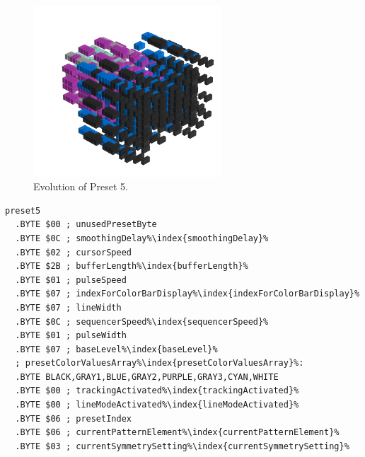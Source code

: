 \clearpage
\rhead[]{\leftmark}
\begin{minipage}[b]{0.48\linewidth}

\begin{figure}[H]                                                          
  \centering                                                             
  \begin{adjustbox}{width=7cm,center}                                   
  \includegraphics[width=7cm]{src/presets/pattern5-45.png}%
  \end{adjustbox}                                                        
\caption{Evolution of Preset 5.}                                           
\end{figure}                                                               
\end{minipage}
\hspace{0.1cm}
\begin{minipage}[b]{0.48\linewidth}                                       
                                                                           
\begin{lstlisting}[basicstyle=\ttfamily\scriptsize,caption=Data structure for Preset 5.,escapechar=\%]
preset5
  .BYTE $00 ; unusedPresetByte
  .BYTE $0C ; smoothingDelay%\index{smoothingDelay}%
  .BYTE $02 ; cursorSpeed
  .BYTE $2B ; bufferLength%\index{bufferLength}%
  .BYTE $01 ; pulseSpeed
  .BYTE $07 ; indexForColorBarDisplay%\index{indexForColorBarDisplay}%
  .BYTE $07 ; lineWidth
  .BYTE $0C ; sequencerSpeed%\index{sequencerSpeed}%
  .BYTE $01 ; pulseWidth
  .BYTE $07 ; baseLevel%\index{baseLevel}%
  ; presetColorValuesArray%\index{presetColorValuesArray}%: 
  .BYTE BLACK,GRAY1,BLUE,GRAY2,PURPLE,GRAY3,CYAN,WHITE
  .BYTE $00 ; trackingActivated%\index{trackingActivated}%
  .BYTE $00 ; lineModeActivated%\index{lineModeActivated}%
  .BYTE $06 ; presetIndex
  .BYTE $06 ; currentPatternElement%\index{currentPatternElement}%
  .BYTE $03 ; currentSymmetrySetting%\index{currentSymmetrySetting}%
\end{lstlisting}
\end{minipage}

